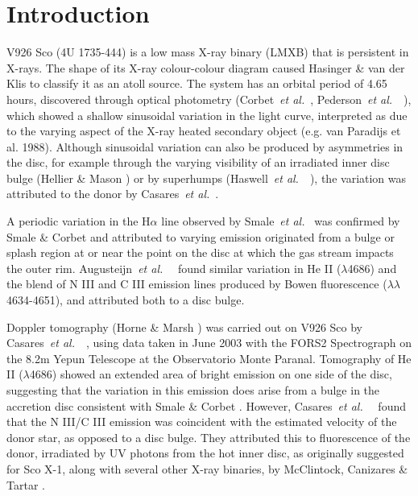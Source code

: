 \documentclass{aa}
\def\etal{{\em et al.}\ }
\begin{document}

   \maketitle

%

\section{Introduction}

V926 Sco (4U 1735-444) is a low mass X-ray binary (LMXB) that is persistent in X-rays.  The shape of its X-ray colour-colour diagram caused Hasinger \& van der Klis \cite{hasinger} to classify it as an atoll source. 
The system has an orbital period of 4.65 hours, discovered through optical photometry (Corbet~\etal\cite{corbet}, Pederson~\etal~\citep{pederson}), which showed a shallow sinusoidal variation in the light curve, interpreted as due to the varying aspect of the X-ray heated secondary object (e.g. van Paradijs et al. 1988). 
Although sinusoidal variation can also be produced by asymmetries in the disc, 
for example through the varying visibility of an irradiated inner disc bulge 
(Hellier \& Mason \cite{hellier}) or by superhumps (Haswell~\etal~\cite{haswell}), 
the variation was attributed to the donor by Casares~\etal \cite{casares}. 

A periodic variation in the H$\alpha$ line observed by Smale~\etal \cite{smale} was confirmed by
Smale \& Corbet \cite{smalecorbet} and attributed
to varying emission originated from a bulge or splash region at or near the point on the disc at which the gas stream impacts the outer rim.  Augusteijn~\etal~\cite{august} found similar variation in He II ($\lambda$4686) and the blend of N III and C III emission lines produced by Bowen fluorescence ($\lambda\lambda$4634-4651), and attributed both to a disc bulge.

Doppler tomography (Horne \& Marsh \cite{horne}) was carried out on V926 Sco by 
Casares~\etal~\cite{casares}, using data taken in June 2003 with the FORS2 Spectrograph on the 8.2m Yepun Telescope at the Observatorio Monte Paranal. 
Tomography of He II ($\lambda$4686) showed an extended area of bright emission on one side of the disc,     
suggesting that the variation in this emission does arise from a bulge in the accretion disc 
consistent with Smale \& Corbet \cite{smalecorbet}. 
However, Casares~\etal~\cite{casares} found that the N III/C III emission was coincident with the estimated velocity of the donor star, as opposed to a disc bulge. They attributed this to fluorescence of the donor, irradiated by UV photons from the hot inner disc, as originally suggested for Sco X-1, along
with several other X-ray binaries, by McClintock, Canizares \& Tartar \cite{mcclintock}.
\end{document}

